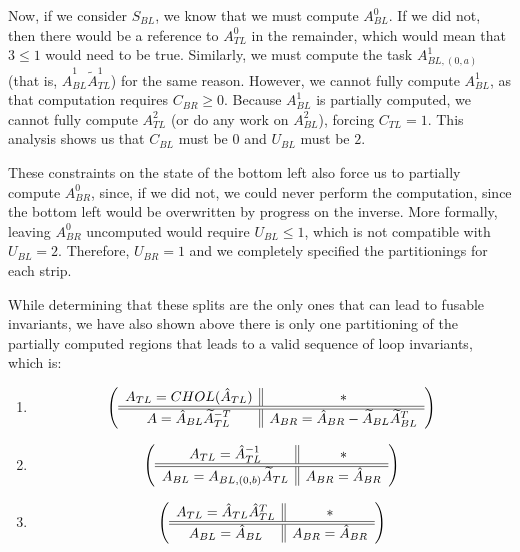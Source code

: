 \documentclass[12pt,letterpaper]{article}
\newcommand*{\opF}{\mathcal{F}}
\begin{document}
Now, if we consider $S_{BL}$, we know that we must compute $A_{BL}^0$.
If we did not, then there would be a reference to $A_{TL}^0$ in the remainder, which would mean that $3 \leq 1$ would need to be true.
Similarly, we must compute the task $A_{BL, (0, a)}^1$ (that is, $\hat{A}_{BL}^1\widetilde{A}_{TL}^1$) for the same reason.
However, we cannot fully compute $A^1_{BL}$, as that computation requires $C_{BR} \geq 0$.
Because $A^1_{BL}$ is partially computed, we cannot fully compute $A_{TL}^2$ (or do any work on $A_{BL}^2$), forcing $C_{TL} = 1$.
This analysis shows us that $C_{BL}$ must be $0$ and $U_{BL}$ must be $2$.

These constraints on the state of the bottom left also force us to partially compute $A_{BR}^0$, since, if we did not, we could never perform the computation, since the bottom left would be overwritten by progress on the inverse.
More formally, leaving $A_{BR}^0$ uncomputed would require $U_{BL} \leq 1$, which is not compatible with $U_{BL} = 2$.
Therefore, $U_{BR} = 1$ and we completely specified the partitionings for each strip.

While determining that these splits are the only ones that can lead to fusable invariants, we have also shown above there is only one partitioning of the partially computed regions that leads to a valid sequence of loop invariants, which is:
\begin{enumerate}
\item
  \begin{equation*}
  \left( \begin{array}{c || c} A_{TL}  = CHOL(\hat{A}_{TL}) & * \\ \hline \hline A = \hat{A}_{BL}\widetilde{A}_{TL}^{-T} & A_{BR} = \hat{A}_{BR} - \widetilde{A}_{BL}\widetilde{A}_{BL}^T \end{array} \right)
  \end{equation*}
\item
  \begin{equation*}
    \left( \begin{array}{c || c} A_{TL} = \hat{A}_{TL}^{-1} & * \\ \hline \hline A_{BL} = A_{BL, (0, b)}\widetilde{A}_{TL} & A_{BR} =  \hat{A}_{BR} \end{array} \right)
  \end{equation*}
\item
  \begin{equation*}
    \left( \begin{array}{c || c} A_{TL} = \hat{A}_{TL}\hat{A}_{TL}^T & * \\ \hline \hline A_{BL} = \hat{A}_{BL} & A_{BR} = \hat{A}_{BR} \end{array} \right)
  \end{equation*}
\end{enumerate}

\end{document}
